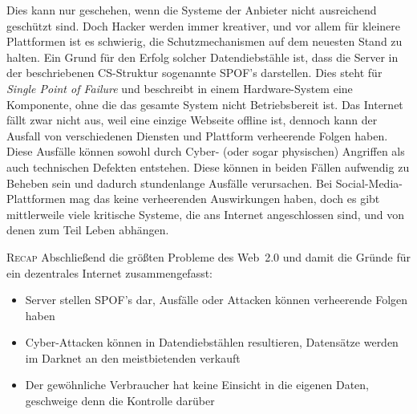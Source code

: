 Dies kann nur geschehen, wenn die Systeme der Anbieter nicht ausreichend geschützt sind. Doch Hacker werden immer kreativer, und vor allem für kleinere Plattformen ist es schwierig, die Schutzmechanismen auf dem neuesten Stand zu halten. 
Ein Grund für den Erfolg solcher Datendiebstähle ist, dass die Server in der beschriebenen CS-Struktur sogenannte SPOF's darstellen. Dies steht für \textit{Single Point of Failure} und beschreibt in einem Hardware-System eine Komponente, ohne die das gesamte System nicht Betriebsbereit ist. Das Internet fällt zwar nicht aus, weil eine einzige Webseite offline ist, dennoch kann der Ausfall von verschiedenen Diensten und Plattform verheerende Folgen haben. Diese Ausfälle können sowohl durch Cyber- (oder sogar physischen) Angriffen als auch technischen Defekten entstehen. Diese können in beiden Fällen aufwendig zu Beheben sein und dadurch stundenlange Ausfälle verursachen. Bei Social-Media-Plattformen mag das keine verheerenden Auswirkungen haben, doch es gibt mittlerweile viele kritische Systeme, die ans Internet angeschlossen sind, und von denen zum Teil Leben abhängen.

\smallskip

\textsc{Recap} Abschließend die größten Probleme des Web~2.0 und damit die Gründe für ein dezentrales Internet zusammengefasst:
\begin{itemize}
	\item Server stellen SPOF's dar, Ausfälle oder Attacken können verheerende Folgen haben
	\item Cyber-Attacken können in Datendiebstählen resultieren, Datensätze werden im Darknet an den meistbietenden verkauft
	\item Der gewöhnliche Verbraucher hat keine Einsicht in die eigenen Daten, geschweige denn die Kontrolle darüber
\end{itemize}


\smallskip





